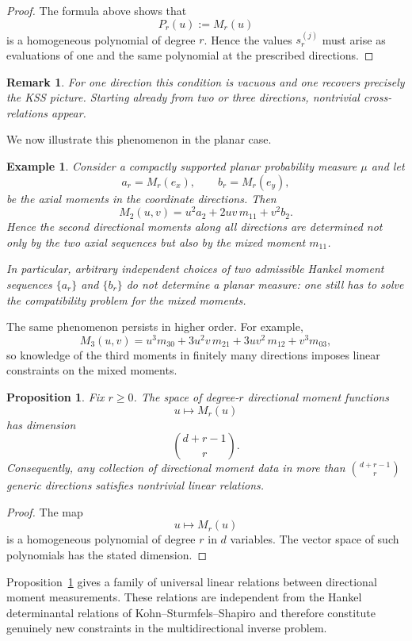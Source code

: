 \documentclass[reqno]{amsart}
\numberwithin{theorem}{section}
\newtheorem{proposition}[theorem]{Proposition}
\newtheorem{remark}[theorem]{Remark}
\newtheorem{example}[theorem]{Example}
\begin{document}
\begin{proof}
The formula above shows that
\[
P_r(u):=M_r(u)
\]
is a homogeneous polynomial of degree $r$.  Hence the values
$s_r^{(j)}$ must arise as evaluations of one and the same polynomial
at the prescribed directions.
\end{proof}

\begin{remark}
For one direction this condition is vacuous and one recovers precisely the
KSS picture.  Starting already from two or three directions, nontrivial
cross-relations appear.
\end{remark}

We now illustrate this phenomenon in the planar case.

\begin{example}
Consider a compactly supported planar probability measure $\mu$ and let
\[
a_r=M_r(e_x),\qquad
b_r=M_r(e_y),
\]
be the axial moments in the coordinate directions.
Then
\[
M_2(u,v)=u^2 a_2+2uv\,m_{11}+v^2 b_2.
\]
Hence the second directional moments along \emph{all} directions are
determined not only by the two axial sequences but also by the mixed moment
$m_{11}$.

In particular, arbitrary independent choices of two admissible Hankel
moment sequences $\{a_r\}$ and $\{b_r\}$ do not determine a planar measure:
one still has to solve the compatibility problem for the mixed moments.
\end{example}

The same phenomenon persists in higher order.  For example,
\[
M_3(u,v)
=
u^3 m_{30}
+
3u^2v\,m_{21}
+
3uv^2\,m_{12}
+
v^3 m_{03},
\]
so knowledge of the third moments in finitely many directions imposes
linear constraints on the mixed moments.

\begin{proposition}\label{pr:rank}
Fix $r\ge0$.  The space of degree-$r$ directional moment functions
\[
u\mapsto M_r(u)
\]
has dimension
\[
\binom{d+r-1}{r}.
\]
Consequently, any collection of directional moment data in more than
$\binom{d+r-1}{r}$ generic directions satisfies nontrivial linear
relations.
\end{proposition}

\begin{proof}
The map
\[
u\mapsto M_r(u)
\]
is a homogeneous polynomial of degree $r$ in $d$ variables.  The vector
space of such polynomials has the stated dimension.
\end{proof}

Proposition~\ref{pr:rank} gives a family of universal linear relations
between directional moment measurements.  These relations are independent
from the Hankel determinantal relations of Kohn--Sturmfels--Shapiro and
therefore constitute genuinely new constraints in the multidirectional
inverse problem.
\end{document}
